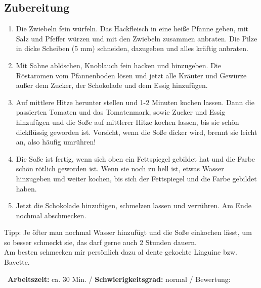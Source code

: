 \begin{minipage}[t]{0.58\textwidth}
\vspace{0pt}
\subsection*{Zubereitung}
\begin{enumerate}[leftmargin=*, itemindent=14pt]
\item Die Zwiebeln fein würfeln. Das Hackfleisch in eine heiße Pfanne geben, mit Salz und Pfeffer würzen und mit den Zwiebeln zusammen anbraten. Die Pilze in dicke Scheiben (5 mm) schneiden, dazugeben und alles kräftig anbraten.\\

\item Mit Sahne ablöschen, Knoblauch fein hacken und hinzugeben. Die Röstaromen vom Pfannenboden lösen und jetzt alle Kräuter und Gewürze außer dem Zucker, der Schokolade und dem Essig hinzufügen.\\

\item Auf mittlere Hitze herunter stellen und 1-2 Minuten kochen lassen. Dann die passierten Tomaten und das Tomatenmark, sowie Zucker und Essig hinzufügen und die Soße auf mittlerer Hitze kochen lassen, bis sie schön dickflüssig geworden ist. Vorsicht, wenn die Soße dicker wird, brennt sie leicht an, also häufig umrühren!\\

\item Die Soße ist fertig, wenn sich oben ein Fettspiegel gebildet hat und die Farbe schön rötlich geworden ist. Wenn sie noch zu hell ist, etwas Wasser hinzugeben und weiter kochen, bis sich der Fettspiegel und die Farbe gebildet haben. \\

\item Jetzt die Schokolade hinzufügen, schmelzen lassen und verrühren. Am Ende nochmal abschmecken. \\
\end{enumerate}
Tipp: Je öfter man nochmal Wasser hinzufügt und die Soße einkochen lässt, um so besser schmeckt sie, das darf gerne auch 2 Stunden dauern.\\

Am besten schmecken mir persönlich dazu al dente gekochte Linguine bzw. Bavette.
\end{minipage}
\vfill
\decothreeright \, \textbf{Arbeitszeit:} ca. 30 Min.	 / \textbf{Schwierigkeitsgrad:} normal	 / \decothreeleft \hfill Bewertung: \CIRCLE  \CIRCLE \CIRCLE \CIRCLE \LEFTcircle 